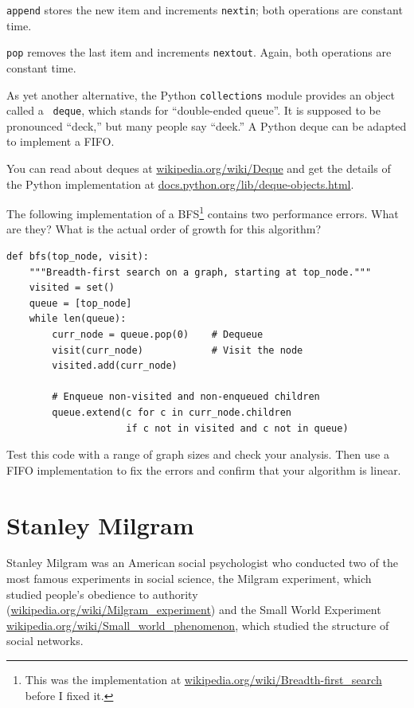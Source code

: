 \documentclass[10pt]{book}
\begin{document}
{\tt append} stores the new item and increments {\tt nextin};
both operations are constant time.

{\tt pop} removes the last item and increments {\tt nextout}.  Again,
both operations are constant time.

As yet another alternative,
the Python {\tt collections} module provides an object called a {\tt
  deque}, which stands for ``double-ended queue''.  It is supposed to
be pronounced ``deck,'' but many people say ``deek.''  A Python deque
can be adapted to implement a FIFO.

You can read about deques at \url{wikipedia.org/wiki/Deque}
and get the details of the Python implementation at
\url{docs.python.org/lib/deque-objects.html}.


\begin{ex}

The following implementation of a BFS\footnote{This was the
  implementation at \url{wikipedia.org/wiki/Breadth-first_search}
  before I fixed it.}  contains two performance errors.  What are
they?  What is the actual order of growth for this algorithm?

\begin{verbatim}
def bfs(top_node, visit):
    """Breadth-first search on a graph, starting at top_node."""
    visited = set()
    queue = [top_node]
    while len(queue):
        curr_node = queue.pop(0)    # Dequeue
        visit(curr_node)            # Visit the node
        visited.add(curr_node)

        # Enqueue non-visited and non-enqueued children
        queue.extend(c for c in curr_node.children
                     if c not in visited and c not in queue)
\end{verbatim}

Test this code with a range of graph sizes and check your analysis.
Then use a FIFO implementation to fix the errors and confirm
that your algorithm is linear.

\end{ex}


\section{Stanley Milgram}

Stanley Milgram was an American social psychologist who conducted
two of the most famous experiments in social science, the
Milgram experiment, which studied people's obedience to authority
(\url{wikipedia.org/wiki/Milgram_experiment})
and the Small World Experiment
\url{wikipedia.org/wiki/Small_world_phenomenon}, which studied
the structure of social networks.
\end{document}
